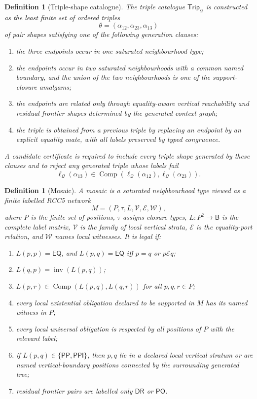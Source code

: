 \documentclass[11pt]{article}
\newtheorem{definition}[theorem]{Definition}
\newcommand{\Base}{\mathsf B}
\newcommand{\EQ}{\mathsf{EQ}}
\newcommand{\DR}{\mathsf{DR}}
\newcommand{\PO}{\mathsf{PO}}
\newcommand{\PP}{\mathsf{PP}}
\newcommand{\PPI}{\mathsf{PPI}}
\newcommand{\Inv}{\operatorname{inv}}
\newcommand{\comp}{\operatorname{Comp}}
\newcommand{\Q}{\mathcal Q}
\newcommand{\Trip}{\mathsf{Trip}}
\begin{document}
\begin{definition}[Triple-shape catalogue]\label{def:triple-shape}
The triple catalogue $\Trip_\Q$ is constructed as the least finite set of ordered triples
\[
   \theta=(\alpha_{12},\alpha_{23},\alpha_{13})
\]
of pair shapes satisfying one of the following generation clauses:
\begin{enumerate}[label=(TSh\arabic*)]
\item the three endpoints occur in one saturated neighbourhood type;
\item the endpoints occur in two saturated neighbourhoods with a common named boundary, and the union of the two neighbourhoods is one of the support-closure amalgams;
\item the endpoints are related only through equality-aware vertical reachability and residual frontier shapes determined by the generated context graph;
\item the triple is obtained from a previous triple by replacing an endpoint by an explicit equality mate, with all labels preserved by typed congruence.
\end{enumerate}
A candidate certificate is required to include every triple shape generated by these clauses and to reject any generated triple whose labels fail
\[
  \ell_\Q(\alpha_{13})\in
  \comp(\ell_\Q(\alpha_{12}),\ell_\Q(\alpha_{23})).
\]
\end{definition}

\begin{definition}[Mosaic]\label{def:mosaic}
A mosaic is a saturated neighbourhood type viewed as a finite labelled RCC5 network
\[
   M=(P,\tau,L,\mathcal V,\mathcal E,\mathcal W),
\]
where $P$ is the finite set of positions, $\tau$ assigns closure types, $L:P^2\to\Base$ is the complete label matrix, $\mathcal V$ is the family of local vertical strata, $\mathcal E$ is the equality-port relation, and $\mathcal W$ names local witnesses.  It is legal if:
\begin{enumerate}[label=(M\arabic*)]
\item $L(p,p)=\EQ$, and $L(p,q)=\EQ$ iff $p=q$ or $p\mathcal E q$;
\item $L(q,p)=\Inv(L(p,q))$;
\item $L(p,r)\in\comp(L(p,q),L(q,r))$ for all $p,q,r\in P$;
\item every local existential obligation declared to be supported in $M$ has its named witness in $P$;
\item every local universal obligation is respected by all positions of $P$ with the relevant label;
\item if $L(p,q)\in\{\PP,\PPI\}$, then $p,q$ lie in a declared local vertical stratum or are named vertical-boundary positions connected by the surrounding generated tree;
\item residual frontier pairs are labelled only $\DR$ or $\PO$.
\end{enumerate}
\end{definition}
\end{document}
